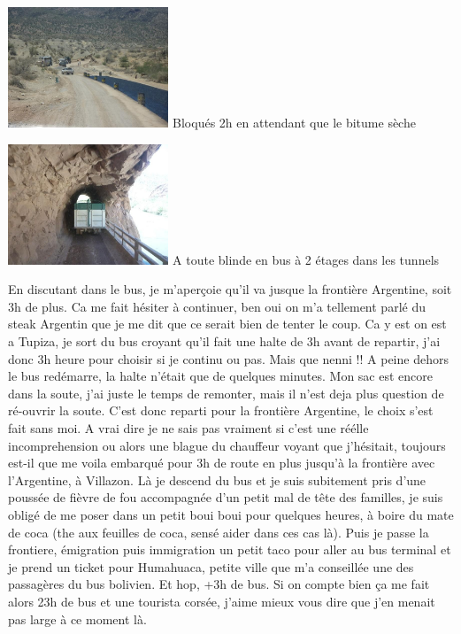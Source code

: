 \begin{multicols}{2}
\hspace*{-0.65cm}
\includegraphics[width=4.8cm]{articles/La-paz-humahuaca-et-salaar/1257387196swjJ.jpg}
Bloqués 2h en attendant que le bitume sèche

\hspace*{-0.65cm}
\includegraphics[width=4.8cm]{articles/La-paz-humahuaca-et-salaar/1257387183J7sM.jpg}
A toute blinde en bus à 2 étages dans les tunnels

En discutant dans le bus, je m'aperçoie qu'il va jusque la frontière Argentine, soit 3h de plus. Ca me fait hésiter à continuer, ben oui on m'a tellement parlé du steak Argentin que je me dit que ce serait bien de tenter le coup. Ca y est on est a Tupiza, je sort du bus croyant qu'il fait une halte de 3h avant de repartir, j'ai donc 3h heure pour choisir si je continu ou pas. Mais que nenni !! A peine dehors le bus redémarre, la halte n'était que de quelques minutes. Mon sac est encore dans la soute, j'ai juste le temps de remonter, mais il n'est deja plus question de ré-ouvrir la soute. C'est donc reparti pour la frontière Argentine, le choix s'est fait sans moi. A vrai dire je ne sais pas vraiment si c'est une réélle incomprehension ou alors une blague du chauffeur voyant que j'hésitait, toujours est-il que me voila embarqué pour 3h de route en plus jusqu'à la frontière avec l'Argentine, à Villazon. Là je descend du bus et je suis subitement pris d'une poussée de fièvre de fou accompagnée d'un petit mal de tête des familles, je suis obligé de me poser dans un petit boui boui pour quelques heures, à boire du mate de coca (the aux feuilles de coca, sensé aider dans ces cas là). Puis je passe la frontiere, émigration puis immigration un petit taco pour aller au bus terminal et je prend un ticket pour Humahuaca, petite ville que m'a conseillée une des passagères du bus bolivien. Et hop, +3h de bus. Si on compte bien ça me fait alors 23h de bus et une tourista corsée, j'aime mieux vous dire que j'en menait pas large à ce moment là.


\end{multicols}
